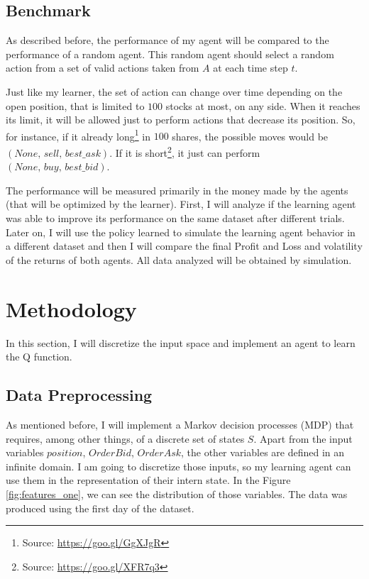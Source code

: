 \documentclass[a4paper]{article}
\begin{document}
\subsection{Benchmark}
As described before, the performance of my agent will be compared to the performance of a random agent. This random agent should select a random action from a set of valid actions taken from $A$ at each time step $t$.

Just like my learner, the set of action can change over time depending on the open position, that is limited to $100$ stocks at most, on any side. When it reaches its limit, it will be allowed just to perform actions that decrease its position. So, for instance, if it already long\footnote{Source: \url{https://goo.gl/GgXJgR}} in $100$ shares, the possible moves would be $\left (None,\, sell,\, best\_ask \right)$. If it is short\footnote{Source: \url{https://goo.gl/XFR7q3}}, it just can perform $\left (None,\, buy,\, best\_bid\right)$.

The performance will be measured primarily in the money made by the agents (that will be optimized by the learner). First, I will analyze if the learning agent was able to improve its performance on the same dataset after different trials. Later on, I will use the policy learned to simulate the learning agent behavior in a different dataset and then I will compare the final Profit and Loss and volatility of the returns of both agents. All data analyzed will be obtained by simulation.


\section{Methodology}
\label{sec:methodology}

In this section, I will discretize the input space and implement an agent to learn the Q function.

\subsection{Data Preprocessing}
As mentioned before, I will implement a Markov decision processes (MDP) that requires, among other things, of a discrete set of states $S$. Apart from the input variables $position$, $OrderBid$, $OrderAsk$, the other variables are defined in an infinite domain. I am going to discretize those inputs, so my learning agent can use them in the representation of their intern state. In the Figure \ref{fig:features_one}, we can see the distribution of those variables. The data was produced using the first day of the dataset.
\end{document}
